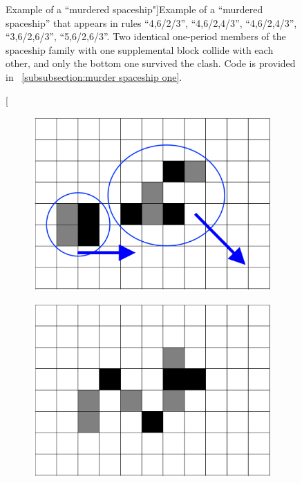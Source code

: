 \documentclass[12pt]{article}
\numberwithin{figure}{section} %
\begin{document}
\begin{figure}[H]
\begin{subfigure}{0.24\textwidth}
     	\subcaption{}
   	\end{subfigure}
   \caption[Example of a “murdered spaceship"]{Example of a “murdered spaceship” that appears in rules “4,6/2/3”, “4,6/2,4/3”, “4,6/2,4/3”, “3,6/2,6/3”, “5,6/2,6/3”. Two identical one-period members of the spaceship family with one supplemental block collide with each other, and only the bottom one survived the clash. Code is provided in ~\ref{subsubsection:murder spaceship one}. }
   \label{fig:murder spaceship one}
   \vspace{-1.5em}
\end{figure}

\begin{figure}[H]
	\begin{subfigure}{0.24\textwidth}
     		\centering
     		\includegraphics[width=\linewidth]{Section4/33.0}
     		\subcaption{}
   	\end{subfigure}
    	\begin{subfigure}{0.24\textwidth}
     		\centering
     		\includegraphics[width=\linewidth]{Section4/33.1}

\end{subfigure}
\end{figure}
\end{document}

